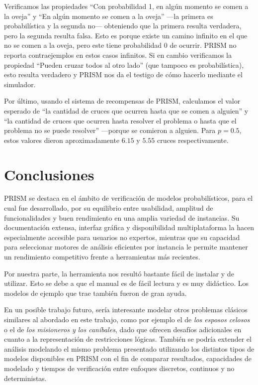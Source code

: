 \documentclass[runningheads]{llncs}
\begin{document}
Verificamos las propiedades ``Con probabilidad 1, en algún momento se comen a la oveja'' y ``En algún momento se comen a la oveja'' —la primera es probabilística y la segunda no— obteniendo que la primera resulta verdadera, pero la segunda resulta falsa. Esto es porque existe un camino infinito en el que no se comen a la oveja, pero este tiene probabilidad 0 de ocurrir. PRISM no reporta contraejemplos en estos casos infinitos. Si en cambio verificamos la propiedad ``Pueden cruzar todos al otro lado'' (que tampoco es probabilística), esto resulta verdadero y PRISM nos da el testigo de cómo hacerlo mediante el simulador.

Por último, usando el sistema de recompensas de PRISM, calculamos el valor esperado de ``la cantidad de cruces que ocurren hasta que se comen a alguien'' y ``la cantidad de cruces que ocurren hasta resolver el problema o hasta que el problema no se puede resolver'' —porque se comieron a alguien. Para $p=0.5$, estos valores dieron aproximadamente $6.15$ y $5.55$ cruces respectivamente.

\section{Conclusiones}
PRISM se destaca en el ámbito de verificación de modelos probabilísticos, para el cual fue desarrollado, por su equilibrio entre usabilidad, amplitud de funcionalidades y buen rendimiento en una amplia variedad de instancias. Su documentación extensa, interfaz gráfica y disponibilidad multiplataforma la hacen especialmente accesible para usuarios no expertos, mientras que su capacidad para seleccionar motores de análisis eficientes por instancia le permite mantener un rendimiento competitivo frente a herramientas más recientes.

Por nuestra parte, la herramienta nos resultó bastante fácil de instalar y de utilizar. Esto se debe a que el manual \cite{PRISMManual} es de fácil lectura y es muy didáctico. Los modelos de ejemplo que trae también fueron de gran ayuda.

En un posible trabajo futuro, sería interesante modelar otros problemas clásicos similares al abordado en este trabajo, como por ejemplo el de \textit{los esposos celosos} o el de \textit{los misioneros y los caníbales}\cite{Efimova2018}, dado que ofrecen desafíos adicionales en cuanto a la representación de restricciones lógicas. También se podría extender el análisis modelando el mismo problema presentado utilizando los distintos tipos de modelos disponibles en PRISM con el fin de comparar resultados, capacidades de modelado y tiempos de verificación entre enfoques discretos, continuos y no deterministas.
\end{document}
